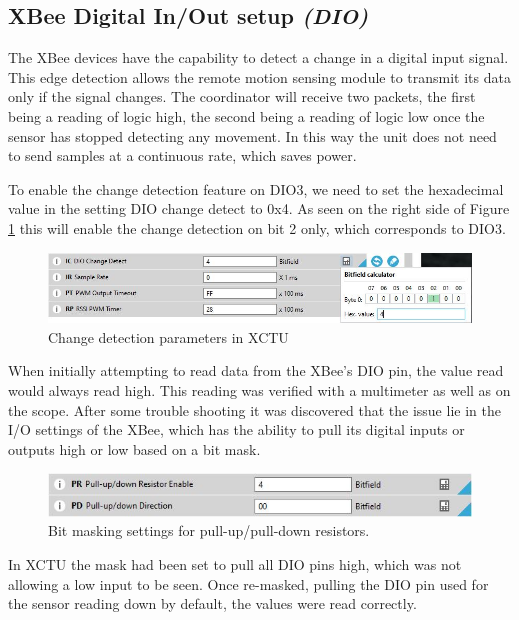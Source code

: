 	\subsection{XBee Digital In/Out setup \textit{(DIO)}}
	\par The XBee devices have the capability to detect a change in a digital input signal. This edge detection allows the remote motion sensing module to transmit its data only if the signal changes. The coordinator will receive two packets, the first being a reading of logic high, the second being a reading of logic low once the sensor has stopped detecting any movement. In this way the unit does not need to send samples at a continuous rate, which saves power.
	\par To enable the change detection feature on DIO3, we need to set the hexadecimal value in the setting DIO change detect to 0x4. As seen on the right side of Figure \ref{fig:changeDet} this will enable the change detection on bit 2 only, which corresponds to DIO3. 
	\begin{figure}[h]
		\centering
		\includegraphics[width=0.8\linewidth]{changeDetect.JPG}
		\caption{Change detection parameters in XCTU}
		\label{fig:changeDet}
	\end{figure}
	\par When initially attempting to read data from the XBee's DIO pin, the value read would always read high. This reading was verified with a multimeter as well as on the scope. After some trouble shooting it was discovered that the issue lie in the I/O settings of the XBee, which has the ability to pull its digital inputs or outputs high or low based on a bit mask. 
	\begin{figure}[h]
		\centering
		\includegraphics[width=0.8\linewidth]{bitMask.JPG}
		\caption{Bit masking settings for pull-up/pull-down resistors.}
		\label{fig:bitMask}
	\end{figure}
	\par In XCTU the mask had been set to pull all DIO pins high, which was not allowing a low input to be seen. Once re-masked, pulling the DIO pin used for the sensor reading down by default, the values were read correctly.
	
